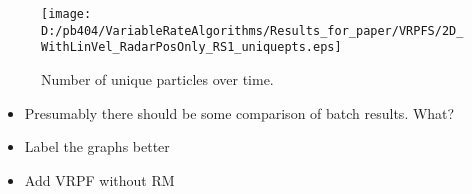 \documentclass[journal]{IEEEtran}
\newenvironment{meta}[0]{\color{red} \em}{}
\begin{document}
\begin{figure}[hbt]
\centering \texttt{[image: D:/pb404/VariableRateAlgorithms/Results\_for\_paper/VRPFS/2D\_WithLinVel\_RadarPosOnly\_RS1\_uniquepts.eps]}
\caption{Number of unique particles over time.}
\label{fig:2D_uniquepts}
\end{figure}



\begin{meta}
\begin{itemize}
	\item Presumably there should be some comparison of batch results. What?
	\item Label the graphs better
	\item Add VRPF without RM
\end{itemize}
\end{meta}




%
%



%
%
\end{document}
